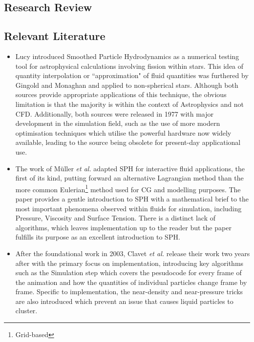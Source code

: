 \documentclass[a4paper,11pt]{article}
\begin{document}
\begin{multicols}{2}
\section{Research Review}
\subsection{Relevant Literature}
\begin{itemize}
 \item Lucy \cite{lucy} introduced Smoothed Particle Hydrodynamics as a numerical testing tool for astrophysical calculations involving fission within stars. This idea of quantity interpolation or ``approximation" of fluid quantities was furthered by Gingold and Monaghan \cite{gingold} and applied to non-spherical stars. Although both sources provide appropriate applications of this technique, the obvious limitation is that the majority is within the context of Astrophysics and not CFD. Additionally, both sources were released in 1977 with major development in the simulation field, such as the use of more modern optimisation techniques which utilise the powerful hardware now widely available, leading to the source being obsolete for present-day applicational use.

 \item The work of Müller \textit{et al.} \cite{muller} adapted SPH for interactive fluid applications, the first of its kind, putting forward an alternative Lagrangian method than the more common Eulerian\footnote{Grid-based} method used for CG and modelling purposes. The paper provides a gentle introduction to SPH with a mathematical brief to the most important phenomena observed within fluids for simulation, including Pressure, Viscosity and Surface Tension. There is a distinct lack of algorithms, which leaves implementation up to the reader but the paper fulfills its purpose as an excellent introduction to SPH.

 \item After the foundational work in 2003, Clavet \textit{et al.} \cite{clavet} release their work two years after with the primary focus on implementation, introducing key algorithms such as the Simulation step which covers the pesudocode for every frame of the animation and how the quantities of individual particles change frame by frame. Specific to implementation, the near-density and near-pressure tricks are also introduced which prevent an issue that causes liquid particles to cluster.%


\end{itemize}
\end{multicols}
\end{document}
